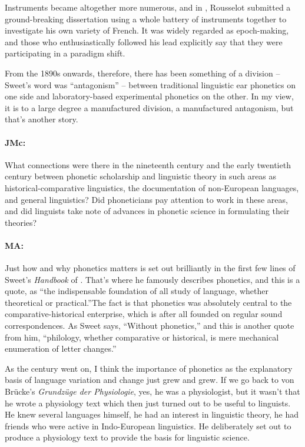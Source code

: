 \documentclass[output=paper]{langscibook}
\begin{document}
Instruments became altogether more numerous, and in \citeyear{rousselot1891a}, Rousselot submitted a ground-breaking dissertation using a whole battery of instruments together to investigate his own variety of French. It was widely regarded as epoch-making, and those who enthusiastically followed his lead explicitly say that they were participating in a paradigm shift. 

From the 1890s onwards, therefore, there has been something of a division – Sweet’s word was ``antagonism'' – between traditional linguistic ear phonetics on one side and laboratory-based experimental phonetics on the other. In my view, it is to a large degree a manufactured division, a manufactured antagonism, but that’s another story.

\paragraph*{JMc:} What connections were there in the nineteenth century and the early twentieth century between phonetic scholarship and linguistic theory in such areas as his\-tor\-i\-cal-comparative linguistics, the documentation of non-European languages, and general linguistics? Did phoneticians pay attention to work in these areas, and did linguists take note of advances in phonetic science in formulating their theories?

\paragraph*{MA:} Just how and why phonetics matters is set out brilliantly in the first few lines of Sweet’s \textit{Handbook} of \citeyear{Sweet1877}.  That’s where he famously describes phonetics, and this is a quote, as ``the indispensable foundation of all study of language, whether theoretical or practical.''The fact is that phonetics was absolutely central to the comparative-historical enterprise, which is after all founded on regular sound correspondences. As Sweet says, ``Without phonetics,'' and this is another quote from him, ``philology, whether comparative or historical, is mere mechanical enumeration of letter changes.''

As the century went on, I think the importance of phonetics as the explanatory basis of language variation and change just grew and grew. If we go back to von Brücke’s \textit{Grundzüge der Physiologie}, yes, he was a physiologist, but it wasn’t that he wrote a physiology text which then just turned out to be useful to linguists. He knew several languages himself, he had an interest in linguistic theory, he had friends who were active in Indo-European linguistics. He deliberately set out to produce a physiology text to provide the basis for linguistic science.
\end{document}

